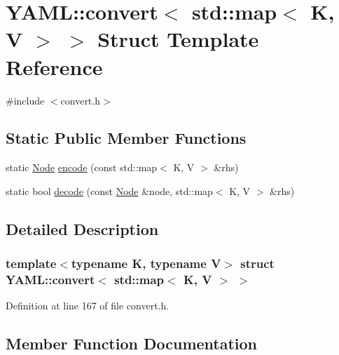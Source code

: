 \hypertarget{struct_y_a_m_l_1_1convert_3_01std_1_1map_3_01_k_00_01_v_01_4_01_4}{}\section{Y\+A\+ML\+::convert$<$ std\+::map$<$ K, V $>$ $>$ Struct Template Reference}
\label{struct_y_a_m_l_1_1convert_3_01std_1_1map_3_01_k_00_01_v_01_4_01_4}


{\ttfamily \#include $<$convert.\+h$>$}

\subsection*{Static Public Member Functions}
\begin{DoxyCompactItemize}
\item 
static \mbox{\hyperlink{class_y_a_m_l_1_1_node}{Node}} \mbox{\hyperlink{struct_y_a_m_l_1_1convert_3_01std_1_1map_3_01_k_00_01_v_01_4_01_4_a2b2690ea4922d3d843951496105d190f}{encode}} (const std\+::map$<$ K, V $>$ \&rhs)
\item 
static bool \mbox{\hyperlink{struct_y_a_m_l_1_1convert_3_01std_1_1map_3_01_k_00_01_v_01_4_01_4_af11119d8caf335b593af535443d745fc}{decode}} (const \mbox{\hyperlink{class_y_a_m_l_1_1_node}{Node}} \&node, std\+::map$<$ K, V $>$ \&rhs)
\end{DoxyCompactItemize}


\subsection{Detailed Description}
\subsubsection*{template$<$typename K, typename V$>$\newline
struct Y\+A\+M\+L\+::convert$<$ std\+::map$<$ K, V $>$ $>$}



Definition at line 167 of file convert.\+h.



\subsection{Member Function Documentation}
\mbox{\label{struct_y_a_m_l_1_1convert_3_01std_1_1map_3_01_k_00_01_v_01_4_01_4_af11119d8caf335b593af535443d745fc}} 
